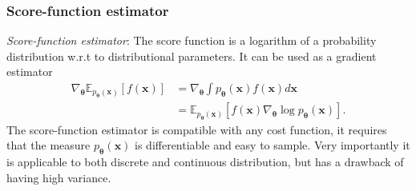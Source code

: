 \subsubsection{Score-function estimator}
\emph{Score-function estimator}: The score function is a logarithm of a probability distribution w.r.t to distributional parameters. It can be used as a gradient estimator
\begin{equation}
\begin{aligned}
\nabla_{\boldsymbol{\theta}} \mathbb{E}_{p_{\boldsymbol{\theta}}(\mathbf{x})}[f(\mathbf{x})] &=  \nabla_{\boldsymbol{\theta}} \int p_{\boldsymbol{\theta}}(\mathbf{x}) f(\mathbf{x}) d \mathbf{x} \\
&= \mathbb{E}_{p_{\boldsymbol{\theta}}(\mathbf{x})}\left[f(\mathbf{x}) \nabla_{\boldsymbol{\theta}} \log p_{\boldsymbol{\theta}}(\mathbf{x})\right].
\end{aligned}
\end{equation}
The score-function estimator is compatible with any cost function, it requires that the measure $p_{\boldsymbol{\theta}}(\mathbf{x})$ is differentiable and easy to sample. Very importantly it is applicable to both discrete and continuous distribution, but has a drawback of having high variance.

